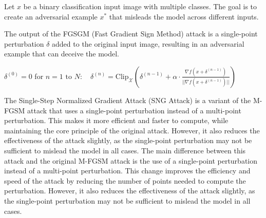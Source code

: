 Let $x$ be a binary classification input image with multiple classes. The goal is to create an adversarial example $x^*$ that misleads the model across different inputs.

The output of the FGSGM (Fast Gradient Sign Method) attack is a single-point perturbation $\delta$ added to the original input image, resulting in an adversarial example that can deceive the model.

$\delta^{(0)} = 0$
for $n = 1 \text{ to } N: \quad
\delta^{(n)} = \text{Clip}_{\mathcal{X}} \left( \delta^{(n-1)} + \alpha \cdot \frac{\nabla f(x+\delta^{(n-1)})}{||\nabla f(x+\delta^{(n-1)})||} \right)$

The Single-Step Normalized Gradient Attack (SNG Attack) is a variant of the M-FGSM attack that uses a single-point perturbation instead of a multi-point perturbation. This makes it more efficient and faster to compute, while maintaining the core principle of the original attack. However, it also reduces the effectiveness of the attack slightly, as the single-point perturbation may not be sufficient to mislead the model in all cases.
The main difference between this attack and the original M-FGSM attack is the use of a single-point perturbation instead of a multi-point perturbation. This change improves the efficiency and speed of the attack by reducing the number of points needed to compute the perturbation. However, it also reduces the effectiveness of the attack slightly, as the single-point perturbation may not be sufficient to mislead the model in all cases.